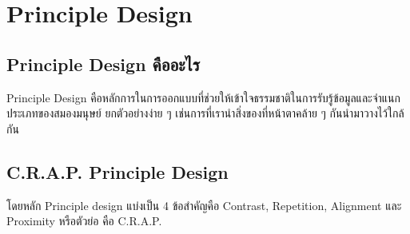 \documentclass[14pt,oneside,openright,a4paper]{cpe-thai-project}
\begin{document}
\section{Principle Design}
  \subsection {Principle Design คืออะไร}
  Principle Design \cite{PrincipleDesign} คือหลักการในการออกแบบที่ช่วยให้เข้าใจธรรมชาติในการรับรู้ข้อมูลและจำแนกประเภทของสมองมนุษย์ ยกตัวอย่างง่าย ๆ เช่นการที่เรานำสิ่งของที่หน้าตาคล้าย ๆ กันนำมาวางไว้ใกล้กัน

  \newpage

\subsection {C.R.A.P. Principle Design}
  โดยหลัก Principle design แบ่งเป็น 4 ข้อสำคัญคือ Contrast, Repetition, Alignment และ Proximity หรือตัวย่อ คือ C.R.A.P.
\end{document}
